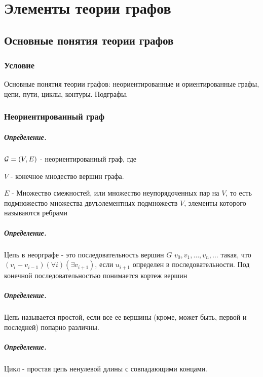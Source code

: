 \documentclass{report}
\begin{document}
\newpage

\chapter{Элементы теории графов}
\section{Основные понятия теории графов}
\subsection{Условие}
Основные понятия теории графов: неориентированные и ориентированные графы,
цепи, пути, циклы, контуры. Подграфы.

\subsection{Неориентированный граф}
\paragraph*{Определение.}
$ {\cal G} = (V, E)$ - неориентированный граф, где

$V$ - конечное мнодество вершин графа.

$E$ - Множество смежностей, или множество неупорядоченных пар на  $V$, то есть подмножество
множества  двуъэлементных подмножеств $V$, элементы которого называются ребрами

\paragraph*{Определение.}
Цепь в неорграфе - это последовательность вершин  $G$  $v_0, v_1,\ldots,v_n,\ldots$ такая, что
$(v_i-v_{i-1})(\forall i)(\exists v_{i+1})$, если $u_{i+1}$ определен в последовательности.
Под конечной последовательностью понимается
кортеж вершин

\paragraph*{Определение.}
Цепь называется простой, если все ее вершины (кроме, может быть, первой и последней) попарно различны.

\paragraph*{Определение.}
Цикл - простая цепь ненулевой длины с совпадающими концами.
\end{document}
